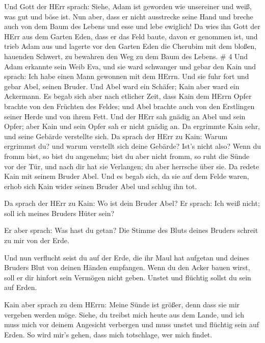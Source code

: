  Und Gott der HErr sprach: Siehe, Adam ist geworden wie
unsereiner und weiß, was gut und böse ist. Nun aber, dass er nicht
ausstrecke seine Hand und breche auch von dem Baum des Lebens und esse
und lebe ewiglich!  Da wies ihn Gott der HErr aus dem
Garten Eden, dass er das Feld baute, davon er genommen ist,
 und trieb Adam aus und lagerte vor den Garten Eden die
Cherubim mit dem bloßen, hauenden Schwert, zu bewahren den Weg zu dem
Baum des Lebens. \# 4  Und Adam erkannte sein Weib Eva, und
sie ward schwanger und gebar den Kain und sprach: Ich habe einen Mann
gewonnen mit dem HErrn.  Und sie fuhr fort und gebar Abel,
seinen Bruder. Und Abel ward ein Schäfer; Kain aber ward ein Ackermann.
 Es begab sich aber nach etlicher Zeit, dass Kain dem HErrn
Opfer brachte von den Früchten des Feldes;  und Abel brachte
auch von den Erstlingen seiner Herde und von ihrem Fett. Und der HErr
sah gnädig an Abel und sein Opfer;  aber Kain und sein Opfer
sah er nicht gnädig an. Da ergrimmte Kain sehr, und seine Gebärde
verstellte sich.  Da sprach der HErr zu Kain: Warum
ergrimmst du? und warum verstellt sich deine Gebärde?  Ist's
nicht also? Wenn du fromm bist, so bist du angenehm; bist du aber nicht
fromm, so ruht die Sünde vor der Tür, und nach dir hat sie Verlangen; du
aber herrsche über sie.  Da redete Kain mit seinem Bruder
Abel. Und es begab sich, da sie auf dem Felde waren, erhob sich Kain
wider seinen Bruder Abel und schlug ihn tot.

 Da sprach der HErr zu Kain: Wo ist dein Bruder Abel? Er
sprach: Ich weiß nicht; soll ich meines Bruders Hüter sein?

 Er aber sprach: Was hast du getan? Die Stimme des Bluts
deines Bruders schreit zu mir von der Erde.

 Und nun verflucht seist du auf der Erde, die ihr Maul hat
aufgetan und deines Bruders Blut von deinen Händen empfangen.
 Wenn du den Acker bauen wirst, soll er dir hinfort sein
Vermögen nicht geben. Unstet und flüchtig sollst du sein auf Erden.

 Kain aber sprach zu dem HErrn: Meine Sünde ist größer,
denn dass sie mir vergeben werden möge.  Siehe, du treibst
mich heute aus dem Lande, und ich muss mich vor deinem Angesicht
verbergen und muss unstet und flüchtig sein auf Erden. So wird mir's
gehen, dass mich totschlage, wer mich findet.

